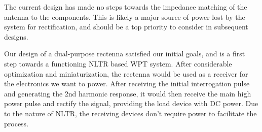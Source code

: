 The current design has made no steps towards the impedance matching of the antenna to the components. This is likely a major source of power lost by the system for rectification, and should be a top priority to consider in subsequent designs.

Our design of a dual-purpose rectenna satisfied our initial goals, and is a first step towards a functioning NLTR based WPT system. After considerable optimization and miniaturization, the rectenna would be used as a receiver for the electronics we want to power. After receiving the initial interrogation pulse and generating the 2nd harmonic response, it would then receive the main high power pulse and rectify the signal, providing the load device with DC power. Due to the nature of NLTR, the receiving devices don’t require power to facilitate the process.
